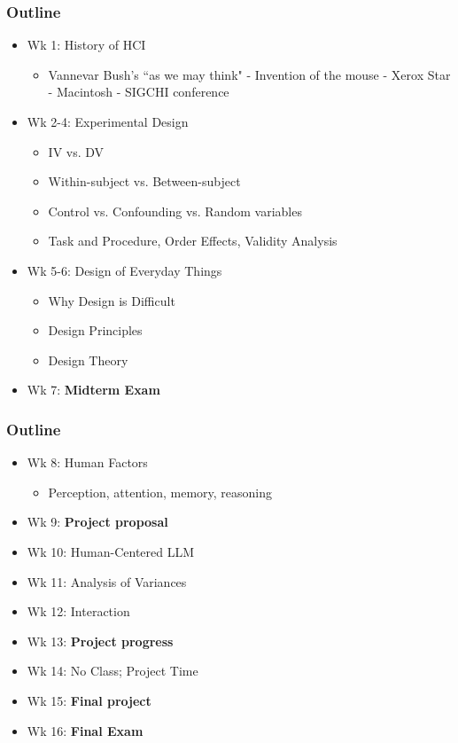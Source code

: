 \documentclass{beamer}
\begin{document}
\begin{frame}
\frametitle{Outline}
\begin{itemize}
	\item Wk 1: History of HCI
	\begin{itemize}
		\item Vannevar Bush's ``as we may think" - Invention of the mouse - Xerox Star - Macintosh - SIGCHI conference
	\end{itemize}
	\item Wk 2-4: Experimental Design
	\begin{itemize}
		\item IV vs. DV
		\item Within-subject vs. Between-subject
		\item Control vs. Confounding vs. Random variables
		\item Task and Procedure, Order Effects, Validity Analysis
	\end{itemize}
	\item Wk 5-6: Design of Everyday Things
	\begin{itemize}
	    \item Why Design is Difficult
		\item Design Principles 
		\item Design Theory
	\end{itemize}	
	\item Wk 7: \textbf{Midterm Exam}
\end{itemize}
\end{frame}

\begin{frame}
	\frametitle{Outline}
	\begin{itemize}
		\item Wk 8: Human Factors
		\begin{itemize}
			\item Perception, attention, memory, reasoning
		\end{itemize}
        \item Wk 9: \textbf{Project proposal}
        \item Wk 10: Human-Centered LLM
        \item Wk 11: Analysis of Variances
        \item Wk 12: Interaction
		\item Wk 13: \textbf{Project progress} 
        \item Wk 14: No Class; Project Time
		\item Wk 15: \textbf{Final project}
		\item Wk 16: \textbf{Final Exam}
	\end{itemize}
\end{frame}
\end{document}
